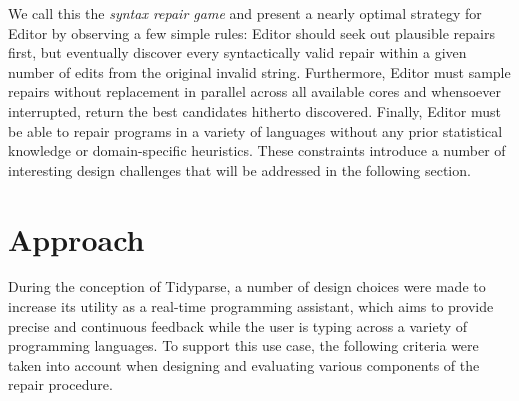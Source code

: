 \documentclass[sigplan,screen]{acmart}
\begin{document}
We call this the \textit{syntax repair game} and present a nearly optimal strategy for Editor by observing a few simple rules: Editor should seek out plausible repairs first, but eventually discover every syntactically valid repair within a given number of edits from the original invalid string. Furthermore, Editor must sample repairs without replacement in parallel across all available cores and whensoever interrupted, return the best candidates hitherto discovered. Finally, Editor must be able to repair programs in a variety of languages without any prior statistical knowledge or domain-specific heuristics. These constraints introduce a number of interesting design challenges that will be addressed in the following section.

\section{Approach}


During the conception of Tidyparse, a number of design choices were made to increase its utility as a real-time programming assistant, which aims to provide precise and continuous feedback while the user is typing across a variety of programming languages. To support this use case, the following criteria were taken into account when designing and evaluating various components of the repair procedure.
\end{document}

